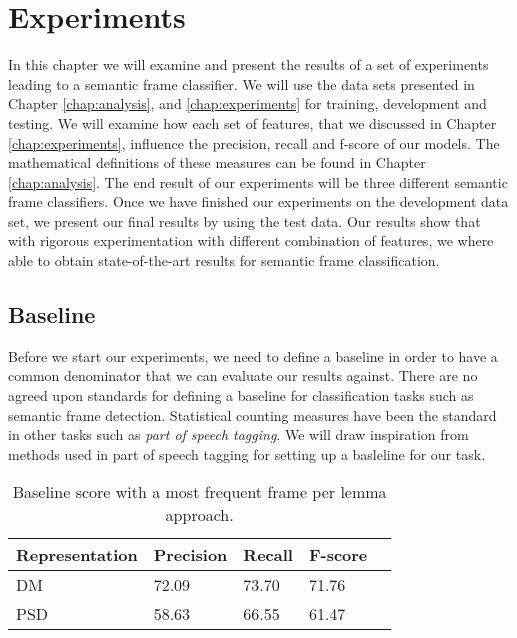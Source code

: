 \chapter{Experiments}
\label{chap:results}


In this chapter we will examine and present the results of a set of experiments leading to a semantic frame classifier. We will use the data sets presented in Chapter \ref{chap:analysis}, and \ref{chap:experiments} for training, development and testing. We will examine how each set of features, that we discussed in Chapter \ref{chap:experiments}, influence the precision, recall and f-score of our models. The mathematical definitions of these measures can be found in Chapter \ref{chap:analysis}. The end result of our experiments will be three different semantic frame classifiers. Once we have finished our experiments on the development data set, we present our final results by using the test data. Our results show that with rigorous experimentation with different combination of features, we where able to obtain state-of-the-art results for semantic frame classification.


\section{Baseline}

Before we start our experiments, we need to define a baseline in order to have a common denominator that we can evaluate our results against. There are no agreed upon standards for defining a baseline for classification tasks such as semantic frame detection. Statistical counting measures have been the standard in other tasks such as \textit{part of speech tagging}. We will draw inspiration from methods used in part of speech tagging for setting up a basleline for our task.

\begin{table}
    \centering
    \smaller[0.2]
    \begin{tabular}{@{}lllll@{}}
        \toprule
        \textbf{Representation} & \textbf{Precision} & \textbf{Recall} & \textbf{F-score} \\
        \midrule
        DM & 72.09 & 73.70 & 71.76\\ 
        PSD & 58.63 & 66.55 & 61.47\\
        \bottomrule
    \end{tabular}
    \caption{Baseline score with a most frequent frame per lemma approach.}
    \label{table:baseline}
\end{table}

